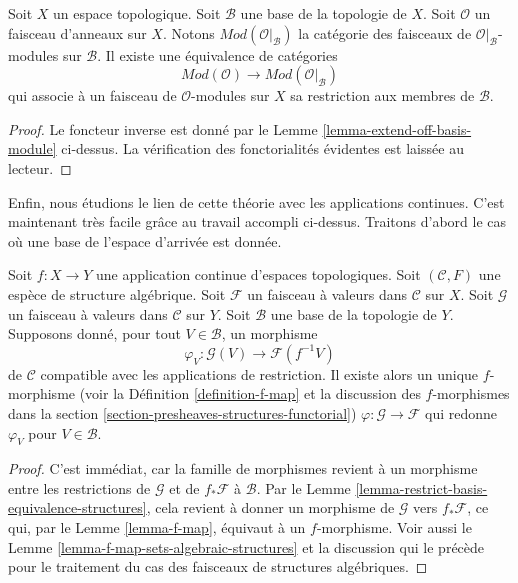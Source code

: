 \begin{lemma}
\label{lemma-restrict-basis-equivalence-modules}
Soit $X$ un espace topologique.
Soit $\mathcal{B}$ une base de la topologie de $X$.
Soit $\mathcal{O}$ un faisceau d'anneaux sur $X$.
Notons $\textit{Mod}(\mathcal{O}|_\mathcal{B})$ la catégorie des
faisceaux de $\mathcal{O}|_\mathcal{B}$-modules sur $\mathcal{B}$.
Il existe une équivalence de catégories
$$
\textit{Mod}(\mathcal{O})
\longrightarrow
\textit{Mod}(\mathcal{O}|_\mathcal{B})
$$
qui associe à un faisceau de $\mathcal{O}$-modules sur $X$ sa restriction aux
membres de $\mathcal{B}$.
\end{lemma}

\begin{proof}
Le foncteur inverse est donné par le
Lemme \ref{lemma-extend-off-basis-module} ci-dessus.
La vérification des fonctorialités évidentes est laissée au lecteur.
\end{proof}

\noindent
Enfin, nous étudions le lien de cette théorie avec les
applications continues. C'est maintenant très facile grâce au travail
accompli ci-dessus. Traitons d'abord le cas où une base de l'espace
d'arrivée est donnée.

\begin{lemma}
\label{lemma-f-map-basis-below-structures}
Soit $f : X \to Y$ une application continue d'espaces topologiques.
Soit $(\mathcal{C}, F)$ une espèce de structure algébrique.
Soit $\mathcal{F}$ un faisceau à valeurs dans $\mathcal{C}$ sur $X$.
Soit $\mathcal{G}$ un faisceau à valeurs dans $\mathcal{C}$ sur $Y$.
Soit $\mathcal{B}$ une base de la topologie de $Y$.
Supposons donné, pour tout $V \in \mathcal{B}$, un morphisme
$$
\varphi_V :
\mathcal{G}(V)
\longrightarrow
\mathcal{F}(f^{-1}V)
$$
de $\mathcal{C}$ compatible avec les applications de restriction.
Il existe alors un unique $f$-morphisme (voir la Définition \ref{definition-f-map}
et la discussion des $f$-morphismes dans la
section \ref{section-presheaves-structures-functorial})
$\varphi : \mathcal{G} \to \mathcal{F}$
qui redonne $\varphi_V$ pour $V \in \mathcal{B}$.
\end{lemma}

\begin{proof}
C'est immédiat, car la famille de morphismes
revient à un morphisme entre les restrictions
de $\mathcal{G}$ et de $f_*\mathcal{F}$ à $\mathcal{B}$.
Par le Lemme \ref{lemma-restrict-basis-equivalence-structures},
cela revient à donner un morphisme de $\mathcal{G}$
vers $f_*\mathcal{F}$, ce qui, par le Lemme \ref{lemma-f-map},
équivaut à un $f$-morphisme. Voir aussi le
Lemme \ref{lemma-f-map-sets-algebraic-structures}
et la discussion qui le précède
pour le traitement du cas des faisceaux de structures algébriques.
\end{proof}


